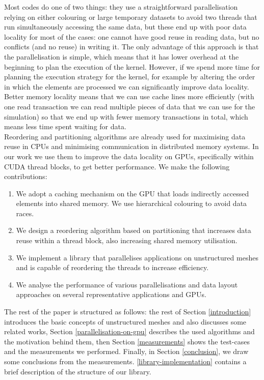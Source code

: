 Most codes do one of two things: they use a straightforward parallelisation
relying on either colouring or large temporary datasets to avoid two threads
that run simultaneously accessing the same data, but these end up with poor
data locality for most of the cases: one cannot have good reuse in reading
data, but no conflicts (and no reuse) in writing it. The only advantage of this
approach is that the parallelisation is simple, which means that it has lower
overhead at the beginning to plan the execution of the kernel. However, if we
spend more time for planning the execution strategy for the kernel, for example
by altering the order in which the elements are processed we can significantly
improve data locality. Better memory locality means that we can use cache lines
more efficiently (with one read transaction we can read multiple pieces of data
that we can use for the simulation) so that we end up with fewer memory
transactions in total, which means less time spent waiting for data.\\
Reordering and partitioning algorithms are already used for maximising data
reuse in CPUs and minimising communication in distributed memory systems. In
our work we use them to improve the data locality on GPUs, specifically within
CUDA thread blocks, to get better performance. We make the following
contributions:
\begin{enumerate}
  \item
    We adopt a caching mechanism on the GPU that loads indirectly accessed
    elements into shared memory. We use hierarchical colouring to avoid data
    races.
  \item
    We design a reordering algorithm based on partitioning that increases data
    reuse within a thread block, also increasing shared memory utilisation.
  \item
    We implement a library that parallelises applications on unstructured meshes
    and is capable of reordering the threads to increase efficiency.
  \item
    We analyse the performance of various parallelisations and data layout
    approaches on several representative applications and GPUs.
\end{enumerate}
The rest of the paper is structured as follows: the rest of Section
\ref{introduction} introduces the basic concepts of unstructured meshes and
also discusses some related works, Section \ref{parallelisation-on-gpu}
describes the used algorithms and the motivation behind them, then Section
\ref{measurements} shows the test-cases and the measurements we performed.
Finally, in Section \ref{conclusion}, we draw some conclusions from the
measurements. \ref{library-implementation} contains a brief
description of the structure of our library.

